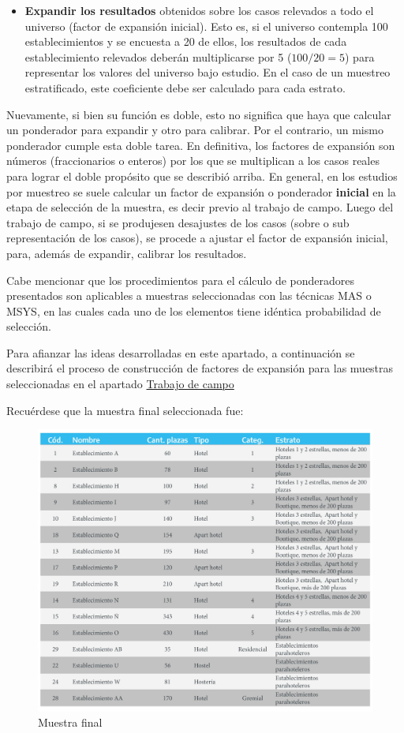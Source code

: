 \documentclass[
]{book}
\providecommand{\tightlist}{%
  \setlength{\itemsep}{0pt}\setlength{\parskip}{0pt}}
\begin{document}
\begin{itemize}
\tightlist
\item
  \textbf{Expandir los resultados} obtenidos sobre los casos relevados a todo el universo (factor de expansión inicial). Esto es, si el universo contempla 100 establecimientos y se encuesta a 20 de ellos, los resultados de cada establecimiento relevados deberán multiplicarse por 5 (\(100/20=5\)) para representar los valores del universo bajo estudio. En el caso de un muestreo estratificado, este coeficiente debe ser calculado para cada estrato.
\end{itemize}

Nuevamente, si bien su función es doble, esto no significa que haya que calcular un ponderador para expandir y otro para calibrar. Por el contrario, un mismo ponderador cumple esta doble tarea. En definitiva, los factores de expansión son números (fraccionarios o enteros) por los que se multiplican a los casos reales para lograr el doble propósito que se describió arriba. En general, en los estudios por muestreo se suele calcular un factor de expansión o ponderador \textbf{inicial} en la etapa de selección de la muestra, es decir previo al trabajo de campo. Luego del trabajo de campo, si se produjesen desajustes de los casos (sobre o sub representación de los casos), se procede a ajustar el factor de expansión inicial, para, además de expandir, calibrar los resultados.

Cabe mencionar que los procedimientos para el cálculo de ponderadores presentados son aplicables a muestras seleccionadas con las técnicas MAS o MSYS, en las cuales cada uno de los elementos tiene idéntica probabilidad de selección.

Para afianzar las ideas desarrolladas en este apartado, a continuación se describirá el proceso de construcción de factores de expansión para las muestras seleccionadas en el apartado \protect\hyperlink{trabajo-de-campo}{Trabajo de campo}

Recuérdese que la muestra final seleccionada fue:

\begin{figure}

{\centering \includegraphics[width=0.8\linewidth]{imagenes/tabla_7a} 

}

\caption{Muestra final}\label{fig:tabla-7a}
\end{figure}
\end{document}

